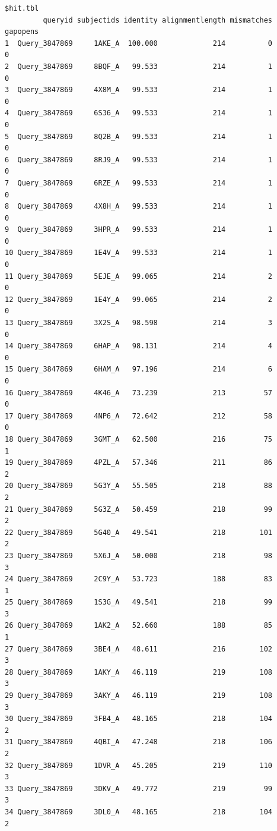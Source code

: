 \documentclass[
  letterpaper,
  DIV=11,
  numbers=noendperiod]{scrartcl}
\begin{document}
\begin{verbatim}
$hit.tbl
         queryid subjectids identity alignmentlength mismatches gapopens
1  Query_3847869     1AKE_A  100.000             214          0        0
2  Query_3847869     8BQF_A   99.533             214          1        0
3  Query_3847869     4X8M_A   99.533             214          1        0
4  Query_3847869     6S36_A   99.533             214          1        0
5  Query_3847869     8Q2B_A   99.533             214          1        0
6  Query_3847869     8RJ9_A   99.533             214          1        0
7  Query_3847869     6RZE_A   99.533             214          1        0
8  Query_3847869     4X8H_A   99.533             214          1        0
9  Query_3847869     3HPR_A   99.533             214          1        0
10 Query_3847869     1E4V_A   99.533             214          1        0
11 Query_3847869     5EJE_A   99.065             214          2        0
12 Query_3847869     1E4Y_A   99.065             214          2        0
13 Query_3847869     3X2S_A   98.598             214          3        0
14 Query_3847869     6HAP_A   98.131             214          4        0
15 Query_3847869     6HAM_A   97.196             214          6        0
16 Query_3847869     4K46_A   73.239             213         57        0
17 Query_3847869     4NP6_A   72.642             212         58        0
18 Query_3847869     3GMT_A   62.500             216         75        1
19 Query_3847869     4PZL_A   57.346             211         86        2
20 Query_3847869     5G3Y_A   55.505             218         88        2
21 Query_3847869     5G3Z_A   50.459             218         99        2
22 Query_3847869     5G40_A   49.541             218        101        2
23 Query_3847869     5X6J_A   50.000             218         98        3
24 Query_3847869     2C9Y_A   53.723             188         83        1
25 Query_3847869     1S3G_A   49.541             218         99        3
26 Query_3847869     1AK2_A   52.660             188         85        1
27 Query_3847869     3BE4_A   48.611             216        102        3
28 Query_3847869     1AKY_A   46.119             219        108        3
29 Query_3847869     3AKY_A   46.119             219        108        3
30 Query_3847869     3FB4_A   48.165             218        104        2
31 Query_3847869     4QBI_A   47.248             218        106        2
32 Query_3847869     1DVR_A   45.205             219        110        3
33 Query_3847869     3DKV_A   49.772             219         99        3
34 Query_3847869     3DL0_A   48.165             218        104        2

\end{verbatim}
\end{document}
